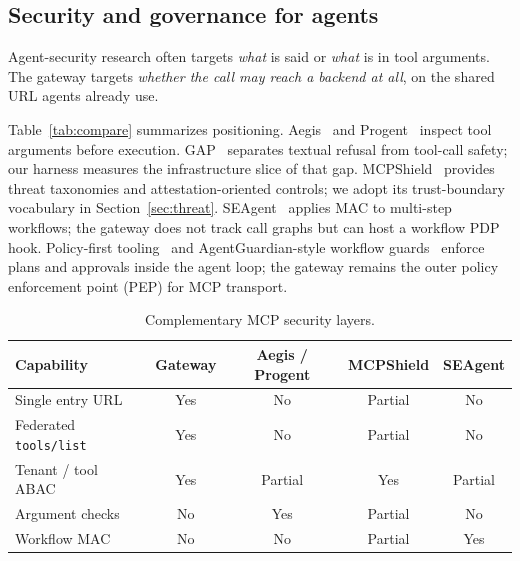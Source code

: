 \documentclass[11pt]{article}
\newcommand{\code}[1]{\texttt{#1}}
\newcommand{\aegis}{Aegis}
\newcommand{\mcpshield}{MCPShield}
\newcommand{\seagent}{SEAgent}
\newcommand{\agentguardian}{AgentGuardian}
\begin{document}
\subsection{Security and governance for agents}

Agent-security research often targets \emph{what} is said or \emph{what} is in tool arguments.
The gateway targets \emph{whether the call may reach a backend at all}, on the shared URL agents already use.

Table~\ref{tab:compare} summarizes positioning.
\aegis~\cite{aegis2026} and Progent~\cite{progent2025} inspect tool arguments before execution.
GAP~\cite{gap2026} separates textual refusal from tool-call safety; our harness measures the infrastructure slice of that gap.
\mcpshield~\cite{mcpshieldFormal2026} provides threat taxonomies and attestation-oriented controls; we adopt its trust-boundary vocabulary in Section~\ref{sec:threat}.
\seagent~\cite{seagent2026} applies MAC to multi-step workflows; the gateway does not track call graphs but can host a workflow PDP hook.
Policy-first tooling~\cite{policyFirstTooling2025} and \agentguardian-style workflow guards~\cite{agentGuardian2025} enforce plans and approvals inside the agent loop; the gateway remains the outer policy enforcement point (PEP) for MCP transport.

\begin{table}[H]
\centering
\caption{Complementary MCP security layers.}
\label{tab:defenses}
\small
\begin{tabular}{@{}lcccc@{}}
\toprule
Capability & Gateway & \aegis{} / Progent & \mcpshield & \seagent \\
\midrule
Single entry URL & Yes & No & Partial & No \\
Federated \code{tools/list} & Yes & No & Partial & No \\
Tenant / tool ABAC & Yes & Partial & Yes & Partial \\
Argument checks & No & Yes & Partial & No \\
Workflow MAC & No & No & Partial & Yes \\
\bottomrule
\end{tabular}
\end{table}
\end{document}
